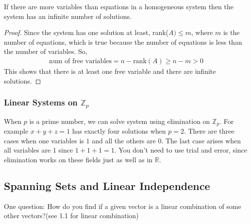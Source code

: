 \documentclass{article}
\begin{document}
If there are more variables than equations in a homogeneous system then the system has an infinite number of solutions.
\begin{proof}
Since the system has one solution at least, rank($A) \leqslant m$, where $m$ is the number of equations, which is true because the number of equations is less than the number of variables. So,
\begin{gather*}
    \textrm{num of free variables} = n - \textrm{rank}(A) \geqslant n - m > 0
\end{gather*}
This shows that there is at least one free variable and there are infinite solutions.
\end{proof}
\subsubsection{Linear Systems on $\mathbb{Z}_p$}
When $p$ is a prime number, we can solve system using elimination on $\mathbb{Z}_p$. For example $x + y + z = 1$ has exactly four solutions when $p = 2$. There are three cases when one variables is $1$ and all the others are $0$. The last case arises when all variables are $1$ since $1 + 1 + 1 = 1$. You don't need to use trial and error, since elimination works on these fields just as well as in $\mathbb{R}$.
\subsection{Spanning Sets and Linear Independence}
One question: How do you find if a given vector is a linear combination of some other vectors?(see 1.1 for linear combination)
\end{document}
